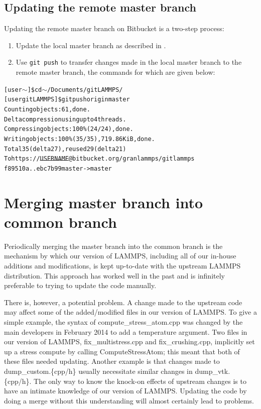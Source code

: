 \documentclass[a4paper,oneside,11pt]{article}
\begin{document}
\subsection{Updating the remote master branch}\label{ssec:urmb}
Updating the remote master branch on Bitbucket is a two-step process:
\begin{enumerate}
  \item Update the local master branch as described in .
  \item Use \texttt{git push} to transfer changes made in the local master branch to the remote master branch, the commands for which are given below:
\end{enumerate}
\begin{alltt}
[user \(\sim\)]\$ cd \(\sim\)/Documents/gitLAMMPS/
[user gitLAMMPS]\$ git push origin master
Counting objects: 61, done.
Delta compression using up to 4 threads.
Compressing objects: 100\% (24/24), done.
Writing objects: 100\% (35/35), 719.86 KiB, done.
Total 35 (delta 27), reused 29 (delta 21)
To https://\sout{USERNAME}@bitbucket.org/granlammps/gitlammps
   f89510a..ebc7b99  master -> master
\end{alltt}

\section{Merging master branch into common branch}
Periodically merging the master branch into the common branch is the mechanism by which our version of LAMMPS, including all of our in-house additions and modifications, is kept up-to-date with the upstream LAMMPS distribution. This approach has worked well in the past and is infinitely preferable to trying to update the code manually. 

There is, however, a potential problem. A change made to the upstream code may affect some of the added\slash modified files in our version of LAMMPS. To give a simple example, the syntax of compute\_stress\_atom.cpp was changed by the main developers in February 2014 to add a temperature argument. Two files in our version of LAMMPS, fix\_multistress.cpp and fix\_crushing.cpp, implicitly set up a stress compute by calling ComputeStressAtom; this meant that both of these files needed updating. Another example is that changes made to dump\_custom.\{cpp\slash h\} usually necessitate similar changes in dump\_vtk.\{cpp\slash h\}. The only way to know the knock-on effects of upstream changes is to have an intimate knowledge of our version of LAMMPS. Updating the code by doing a merge without this understanding will almost certainly lead to problems.
\end{document}
